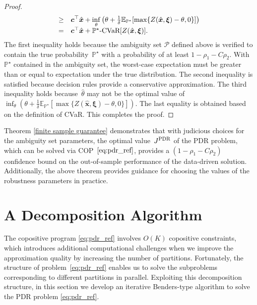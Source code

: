 \documentclass{article}
\newcommand{\PP}{\mathbb{P}}
\newcommand{\EE}{\mathbb{E}}
\begin{document}
\begin{proof}
\begin{equation*}
\begin{array}{rlll}
  \geq & \displaystyle \bm c^\top \hat{\bm x} + \inf_{\theta} \left( \theta + \tfrac{1}{\delta} \EE_{\PP^\star} [\max \{ Z(\hat{\bm x},\bm \xi)-\theta,0 \}] \right)  \\
  = & \bm c^\top \hat{\bm x} + \PP^\star\textup{-CVaR} [Z(\hat{\bm x},  \bm \xi)].
\end{array}
\end{equation*}
The first inequality holds because the ambiguity set $\mathcal{P}$ defined above is verified to contain the true probability~$\PP^{\star}$ with a probability of at least $1-\rho_1 - C\rho_2$. With $\PP^{\star}$ contained in the ambiguity set, the worst-case expectation must be greater than or equal to expectation under the true distribution. The second inequality is satisfied because decision rules provide a conservative approximation. %
The third inequality holds because~$\hat{\theta}$ may not be the optimal value of $\displaystyle \inf_{\theta} \left( \theta + \tfrac{1}{\delta} \EE_{\PP^\star} [\max \{ Z(\hat{\bm x},\bm \xi)-\theta,0 \}] \right)$. The last equality is obtained based on the definition of CVaR. This completes the proof. 
\end{proof}

Theorem \ref{finite sample guarantee} demonstrates that with judicious choices for the ambiguity set parameters, the optimal value~$J^{\textup{PDR}}$ of the PDR problem, which can be solved via COP~$\eqref{eq:pdr_ref}$, provides a $(1 - \rho_1 - C\rho_2)$ confidence bound on the out-of-sample performance of the data-driven solution. Additionally, the above theorem provides guidance for choosing the values of the robustness parameters in practice. 


\section{A Decomposition Algorithm}
\label{decomposition_algorithm}
 The copositive program \eqref{eq:pdr_ref} involves $O(K)$ copositive constraints, which introduces additional computational challenges when we improve the approximation quality by increasing the number of partitions. 
 Fortunately, the structure of problem~\eqref{eq:pdr_ref} enables us to solve the subproblems corresponding to different partitions in parallel. %
Exploiting this decomposition structure, in this section we develop an iterative Benders-type algorithm %
 to solve the PDR problem \eqref{eq:pdr_ref}.
\end{document}
